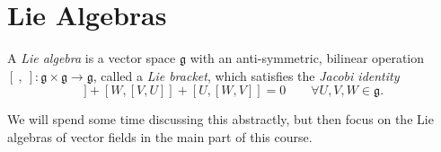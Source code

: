 \section{Lie Algebras}%
\label{sec:lie_algebras}

\begin{definition}
  A \emph{Lie algebra} is a vector space $\mathfrak{g}$ with an anti-symmetric, bilinear operation $[\ ,\ ]\colon \mathfrak{g} \times \mathfrak{g} \to \mathfrak{g}$, called a \emph{Lie bracket}, which satisfies the \emph{Jacobi identity}
  \begin{equation}
    [V, [U, W]] + [W, [V, U]] + [U, [W, V]] = 0 \qquad \forall U, V, W \in \mathfrak{g}.
  \end{equation}
\end{definition}
\begin{leftbar}
  We will spend some time discussing this abstractly, but then focus on the Lie algebras of vector fields in the main part of this course.
\end{leftbar}
